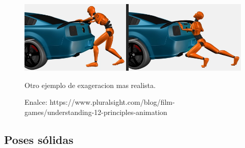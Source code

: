 \documentclass{article}
\begin{document}
\begin{figure}[H]
    \centering
    \includegraphics[width=\textwidth]{imagenes/Exaggeration.png}
    \caption{Otro ejemplo de exageracion mas realista.}
    \caption{Enalce: https://www.pluralsight.com/blog/film-games/understanding-12-principles-animation}
\end{figure}

\subsection{Poses sólidas}
\end{document}
